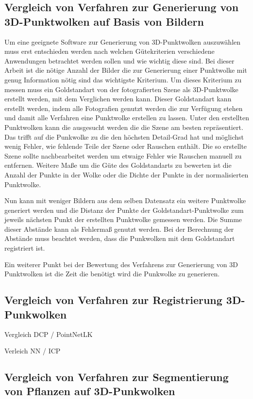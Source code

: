 \documentclass[12pt,titlepage, twoside]{article}
\begin{document}
\subsection{Vergleich von Verfahren zur Generierung von 3D-Punktwolken auf Basis von Bildern}

Um eine geeignete Software zur Generierung von 3D-Punktwolken auszuwählen muss erst entschieden werden nach welchen Gütekriterien verschiedene Anwendungen betrachtet werden sollen und wie wichtig diese sind.
Bei dieser Arbeit ist die nötige Anzahl der Bilder die zur Generierung einer Punktwolke mit genug Information nötig sind das wichtigste Kriterium. 
Um dieses Kriterium zu messen muss ein Goldstandart von der fotografierten Szene als 3D-Punktwolke erstellt werden, mit dem Verglichen werden kann.
Dieser Goldstandart kann erstellt werden, indem alle Fotografien genutzt werden die zur Verfügung stehen und damit alle Verfahren eine Punktwolke erstellen zu lassen. 
Unter den erstellten Punktwolken kann die ausgesucht werden die die Szene am besten repräsentiert. 
Das trifft auf die Punkwolke zu die den höchsten Detail-Grad hat und möglichst wenig Fehler, wie fehlende Teile der Szene oder Rauschen enthält.
Die so erstellte Szene sollte nachbearbeitet werden um etwaige Fehler wie Rauschen manuell zu entfernen.
Weitere Maße um die Güte des Goldstandarts zu bewerten ist die Anzahl der Punkte in der Wolke oder die Dichte der Punkte in der normalisierten Punktwolke.

Nun kann mit weniger Bildern aus dem selben Datensatz ein weitere Punktwolke generiert werden und die Distanz der Punkte der Goldstandart-Punktwolke zum jeweils nächsten Punkt der erstellten Punktwolke gemessen werden.
Die Summe dieser Abstände kann als Fehlermaß genutzt werden. Bei der Berechnung der Abstände muss beachtet werden, dass die Punkwolken mit dem Goldstandart registriert ist.

Ein weiterer Punkt bei der Bewertung des Verfahrens zur Generierung von 3D Punktwolken ist die Zeit die benötigt wird die Punkwolke zu generieren.

\subsection{Vergleich von Verfahren zur Registrierung 3D-Punkwolken}

Vergleich DCP /  PointNetLK

Verleich NN / ICP

\subsection{Vergleich von Verfahren zur Segmentierung von Pflanzen auf 3D-Punkwolken}
\end{document}
